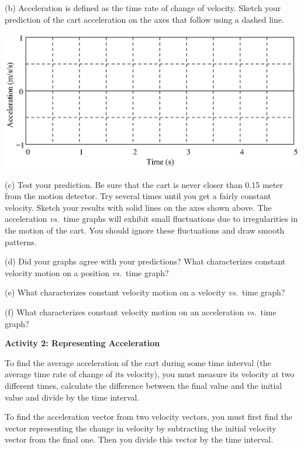 (b) Acceleration is defined as the time rate of change of velocity. Sketch your
prediction of the cart acceleration on the axes that follow using a dashed line.

{\par\centering \includegraphics[scale=1]{changing/changing_fig2.eps} \par}

(c) Test your prediction. Be sure that the cart is never closer than 0.15 meter
from the motion detector. Try several times until you get a fairly constant
velocity. Sketch your results with solid lines on the axes shown above. The
acceleration \textit{vs.}~time graphs will exhibit small fluctuations due to irregularities
in the motion of the cart. You should ignore these fluctuations and draw smooth
patterns.

\pagebreak[2]
(d) Did your graphs agree with your predictions? What characterizes constant
velocity motion on a position \textit{vs.}~time graph? 
\answerspace{10mm}

(e) What characterizes constant velocity motion on a velocity \textit{vs.}~time graph?
\answerspace{10mm}

(f) What characterizes constant velocity motion on an acceleration \textit{vs.}~time graph?
\answerspace{10mm}

\textbf{Activity 2: Representing Acceleration} 

To find the average acceleration of the cart during some time interval (the
average time rate of change of its velocity), you must measure its velocity
at two different times, calculate the difference between the final value and
the initial value and divide by the time interval.

To find the acceleration vector from two velocity vectors, you must first find
the vector representing the change in velocity by subtracting the initial velocity
vector from the final one. Then you divide this vector by the time interval. 


